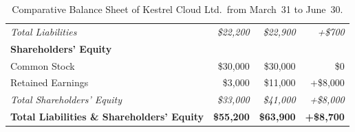 \begin{table}[htbp]
\begin{tabular}{@{}lrrr@{}}
\emph{Total Liabilities}                            & \emph{\$22,200} & \emph{\$22,900} & \emph{+\$700} \\
\textbf{Shareholders' Equity}                       &             &             &              \\
\quad Common Stock                                  & \$30,000    & \$30,000    & \$0          \\
\quad Retained Earnings                             & \$3,000     & \$11,000    & +\$8,000     \\
\emph{Total Shareholders' Equity}                   & \emph{\$33,000} & \emph{\$41,000} & \emph{+\$8,000} \\
\midrule
\textbf{Total Liabilities \& Shareholders' Equity}  & \textbf{\$55,200} & \textbf{\$63,900} & \textbf{+\$8,700} \\
\bottomrule
\end{tabular}
\caption{Comparative Balance Sheet of Kestrel Cloud Ltd.\ from March~31 to June~30.}
\label{tab:ch02-balance-sheet}
\end{table}

